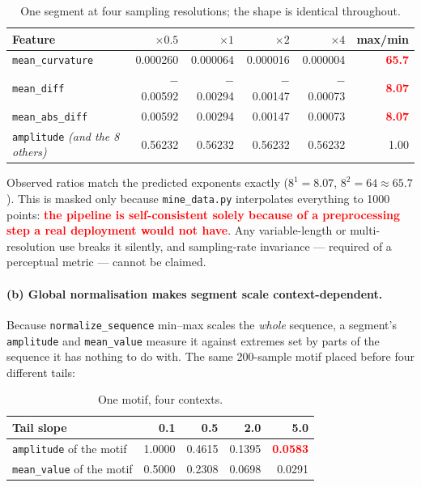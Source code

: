 \documentclass[11pt]{article}
\newcommand{\code}[1]{\texttt{\small #1}}
\newcommand{\finding}[1]{\textcolor{red}{\textbf{#1}}}
\begin{document}
\begin{table}[H]
\centering\small
\caption{One segment at four sampling resolutions; the shape is identical throughout.}
\begin{tabular}{lrrrrr}
\toprule
Feature & $\times0.5$ & $\times1$ & $\times2$ & $\times4$ & max/min \\
\midrule
\code{mean\_curvature} & 0.000260 & 0.000064 & 0.000016 & 0.000004 & \finding{65.7} \\
\code{mean\_diff}      & $-$0.00592 & $-$0.00294 & $-$0.00147 & $-$0.00073 & \finding{8.07} \\
\code{mean\_abs\_diff} & 0.00592 & 0.00294 & 0.00147 & 0.00073 & \finding{8.07} \\
\code{amplitude} \emph{(and the 8 others)} & 0.56232 & 0.56232 & 0.56232 & 0.56232 & 1.00 \\
\bottomrule
\end{tabular}
\end{table}

\vspace{-0.5em}
Observed ratios match the predicted exponents exactly ($8^1 = 8.07$, $8^2 = 64 \approx
65.7$). This is masked only because \code{mine\_data.py} interpolates everything to 1000
points: \finding{the pipeline is self-consistent solely because of a preprocessing step a
real deployment would not have}. Any variable-length or multi-resolution use breaks it
silently, and sampling-rate invariance --- required of a perceptual metric --- cannot be
claimed.

\paragraph{(b) Global normalisation makes segment scale context-dependent.} Because
\code{normalize\_sequence} min--max scales the \emph{whole} sequence, a segment's
\code{amplitude} and \code{mean\_value} measure it against extremes set by parts of the
sequence it has nothing to do with. The same 200-sample motif placed before four different
tails:

\begin{table}[H]
\centering\small
\caption{One motif, four contexts.}
\begin{tabular}{lrrrr}
\toprule
Tail slope & 0.1 & 0.5 & 2.0 & 5.0 \\
\midrule
\code{amplitude} of the motif   & 1.0000 & 0.4615 & 0.1395 & \finding{0.0583} \\
\code{mean\_value} of the motif & 0.5000 & 0.2308 & 0.0698 & 0.0291 \\
\bottomrule
\end{tabular}
\end{table}
\end{document}
